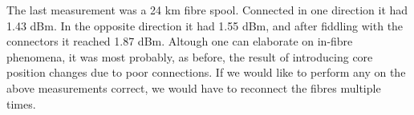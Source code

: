 The last measurement was a 24 km fibre spool.
Connected in one direction it had 1.43 dBm.
In the opposite direction it had 1.55 dBm, and after fiddling with the connectors it reached 1.87 dBm.
Altough one can elaborate on in-fibre phenomena, it was most probably, as before, the result of introducing core position changes due to poor connections.
If we would like to perform any on the above measurements correct, we would have to reconnect the fibres multiple times.






